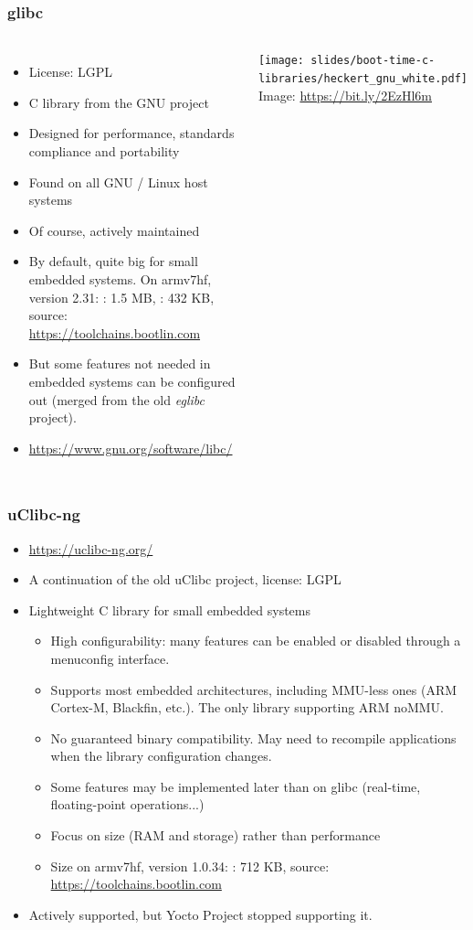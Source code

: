 \begin{frame}
  \frametitle{glibc}
  \begin{columns}
    \begin{itemize}
    \item License: LGPL
    \item C library from the GNU project
    \item Designed for performance, standards compliance and portability
    \item Found on all GNU / Linux host systems
    \item Of course, actively maintained
    \item By default, quite big for small embedded systems.
      On armv7hf, version 2.31: : 1.5 MB, : 432
      KB, source: \url{https://toolchains.bootlin.com}
    \item But some features not needed in embedded systems can be
          configured out (merged from the old {\em eglibc} project).
    \item \url{https://www.gnu.org/software/libc/}
    \end{itemize}
    \vfill
    \minipage[c][0.8\textheight][s]{\columnwidth}
    \texttt{[image: slides/boot-time-c-libraries/heckert\_gnu\_white.pdf]}
    \vfill
    \tiny Image: \url{https://bit.ly/2EzHl6m}
    \endminipage
  \end{columns}
\end{frame}

\begin{frame}
  \frametitle{uClibc-ng}
  \begin{itemize}
  \item \url{https://uclibc-ng.org/}
  \item A continuation of the old uClibc project, license: LGPL
  \item Lightweight C library for small embedded systems
    \begin{itemize}
    \item High configurability: many features can be enabled or
      disabled through a menuconfig interface.
    \item Supports most embedded architectures, including MMU-less
          ones (ARM Cortex-M, Blackfin, etc.). The only library
          supporting ARM noMMU.
    \item No guaranteed binary compatibility. May need to
      recompile applications when the library configuration changes.
    \item Some features may be implemented later than on glibc (real-time,
          floating-point operations...)
    \item Focus on size (RAM and storage) rather than performance
    \item Size on armv7hf, version 1.0.34:
      : 712 KB, source: \url{https://toolchains.bootlin.com}
    \end{itemize}
    \item Actively supported, but Yocto Project stopped supporting it.
  \end{itemize}
\end{frame}

